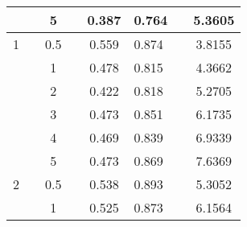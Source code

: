 \documentclass[12pt]{article}
\begin{document}
\begin{table}[!ht]
\begin{tabular}{clclcllc}
                                                  &  & 5                                              &  & 0.387                        & 0.764                                           &  & 5.3605                                                                    \\ \midrule
1                                                 &  & 0.5                                            &  & 0.559                        & 0.874                                           &  & 3.8155                                                                    \\
                                                  &  & 1                                              &  & 0.478                        & 0.815                                           &  & 4.3662                                                                    \\
                                                  &  & 2                                              &  & 0.422                        & 0.818                                           &  & 5.2705                                                                    \\
                                                  &  & 3                                              &  & 0.473                        & 0.851                                           &  & 6.1735                                                                    \\
                                                  &  & 4                                              &  & 0.469                        & 0.839                                           &  & 6.9339                                                                    \\
                                                  &  & 5                                              &  & 0.473                        & 0.869                                           &  & 7.6369                                                                    \\ \midrule
2                                                 &  & 0.5                                            &  & 0.538                        & 0.893                                           &  & 5.3052                                                                    \\
                                                  &  & 1                                              &  & 0.525                        & 0.873                                           &  & 6.1564                                                                    \\

\end{tabular}
\end{table}
\end{document}
